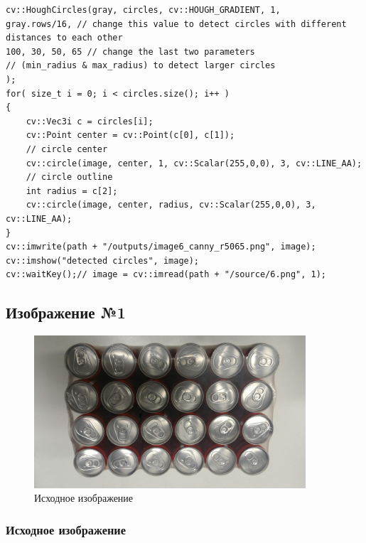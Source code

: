 \begin{lstlisting}[style=cpp_white, caption={Общий код для поиска окружностей с помощью преобразования Хафа}]
cv::HoughCircles(gray, circles, cv::HOUGH_GRADIENT, 1,
gray.rows/16, // change this value to detect circles with different distances to each other
100, 30, 50, 65 // change the last two parameters
// (min_radius & max_radius) to detect larger circles
);
for( size_t i = 0; i < circles.size(); i++ )
{
    cv::Vec3i c = circles[i];
    cv::Point center = cv::Point(c[0], c[1]);
    // circle center
    cv::circle(image, center, 1, cv::Scalar(255,0,0), 3, cv::LINE_AA);
    // circle outline
    int radius = c[2];
    cv::circle(image, center, radius, cv::Scalar(255,0,0), 3, cv::LINE_AA);
}
cv::imwrite(path + "/outputs/image6_canny_r5065.png", image);
cv::imshow("detected circles", image);
cv::waitKey();// image = cv::imread(path + "/source/6.png", 1);
\end{lstlisting}

\subsection{Изображение №1}

\begin{figure}[H]
    \centering
    \includegraphics[width=0.9\textwidth]{../source/6.png}
    \caption{Исходное изображение}
    \label{fig:image_source}
\end{figure}

\subsubsection{Исходное изображение}


